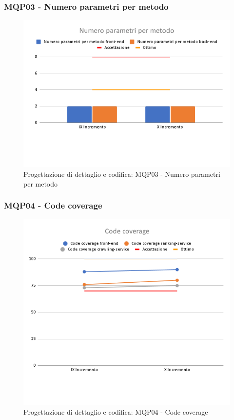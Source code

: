 \subsubsection{MQP03 - Numero parametri per metodo}
\begin{figure}[H]
    \centering
    \includegraphics[scale=0.50]{Sezioni/images/last_prodotto/Numero_parametri_per_metodo.png}
    \caption{Progettazione di dettaglio e codifica: MQP03 - Numero parametri per metodo}
\end{figure}
\subsubsection{MQP04 - Code coverage}
\begin{figure}[H]
    \centering
    \includegraphics[scale=0.50]{Sezioni/images/last_prodotto/Code_coverage.png}
    \caption{Progettazione di dettaglio e codifica: MQP04 - Code coverage}
\end{figure}
